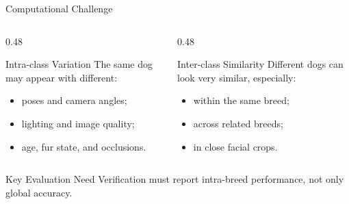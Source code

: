 \documentclass[aspectratio=169,11pt]{beamer}
\begin{document}
\begin{frame}{Computational Challenge}
  \begin{columns}[T,onlytextwidth]
    \begin{column}{0.48\textwidth}
      \begin{block}{Intra-class Variation}
        The same dog may appear with different:
        \begin{itemize}
          \item poses and camera angles;
          \item lighting and image quality;
          \item age, fur state, and occlusions.
        \end{itemize}
      \end{block}
    \end{column}
    \begin{column}{0.48\textwidth}
      \begin{block}{Inter-class Similarity}
        Different dogs can look very similar, especially:
        \begin{itemize}
          \item within the same breed;
          \item across related breeds;
          \item in close facial crops.
        \end{itemize}
      \end{block}
    \end{column}
  \end{columns}

  \vspace{0.25cm}
  \begin{center}
    \begin{minipage}{0.72\textwidth}
      \begin{alertblock}{Key Evaluation Need}
        Verification must report intra-breed performance, not only global accuracy.
      \end{alertblock}
    \end{minipage}
  \end{center}
\end{frame}
\end{document}

